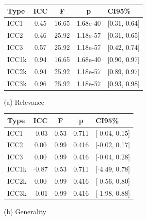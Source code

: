 \begin{figure}[h]
    \centering
    \begin{minipage}{.5\textwidth}
        \centering
        \begin{tabular}{lcccl}
            \hline
            \textbf{Type} & \textbf{ICC} & \textbf{F} & \textbf{p} & \textbf{CI95\%} \\
            \hline
            ICC1          & 0.45         & 16.65      & 1.68e-40   & [0.31, 0.64]    \\
            ICC2          & 0.46         & 25.92      & 1.18e-57   & [0.31, 0.65]    \\
            ICC3          & 0.57         & 25.92      & 1.18e-57   & [0.42, 0.74]    \\
            ICC1k         & 0.94         & 16.65      & 1.68e-40   & [0.90, 0.97]    \\
            ICC2k         & 0.94         & 25.92      & 1.18e-57   & [0.89, 0.97]    \\
            ICC3k         & 0.96         & 25.92      & 1.18e-57   & [0.93, 0.98]    \\
            \hline
        \end{tabular}
        \caption*{(a) Relevance}
    \end{minipage}%
    \begin{minipage}{.5\textwidth}
        \centering
        \begin{tabular}{lcccl}
            \hline
            \textbf{Type} & \textbf{ICC} & \textbf{F} & \textbf{p} & \textbf{CI95\%} \\
            \hline
            ICC1          & -0.03        & 0.53       & 0.711      & [-0.04, 0.15]   \\
            ICC2          & 0.00         & 0.99       & 0.416      & [-0.02, 0.17]   \\
            ICC3          & 0.00         & 0.99       & 0.416      & [-0.04, 0.28]   \\
            ICC1k         & -0.87        & 0.53       & 0.711      & [-4.49, 0.78]   \\
            ICC2k         & 0.00         & 0.99       & 0.416      & [-0.56, 0.80]   \\
            ICC3k         & -0.01        & 0.99       & 0.416      & [-1.98, 0.88]   \\
            \hline
        \end{tabular}
        \caption*{(b) Generality}
    \end{minipage}


\end{figure}
